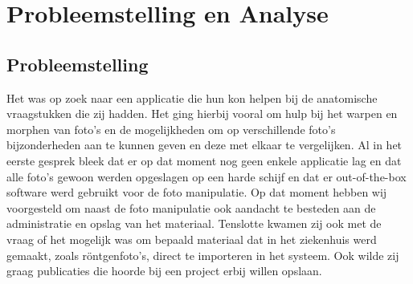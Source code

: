 \section{Probleemstelling en Analyse}
\label{Probleemstelling_en_analyse}
\subsection{Probleemstelling}
Het \casamproject was op zoek naar een applicatie die hun kon helpen bij de anatomische vraagstukken die zij hadden. 
Het ging hierbij vooral om hulp bij het warpen en morphen van foto's en de mogelijkheden om op verschillende foto's bijzonderheden aan te kunnen geven en deze met elkaar te vergelijken. 
Al in het eerste gesprek bleek dat er op dat moment nog geen enkele applicatie lag en dat alle foto's gewoon werden opgeslagen op een harde schijf en dat er out-of-the-box software werd gebruikt voor de foto manipulatie. 
Op dat moment hebben wij voorgesteld om naast de foto manipulatie ook aandacht te besteden aan de administratie en opslag van het materiaal.
Tenslotte kwamen zij ook met de vraag of het mogelijk was om bepaald materiaal dat in het ziekenhuis werd gemaakt, zoals r\"{o}ntgenfoto's, direct te importeren in het systeem. Ook wilde zij graag publicaties die hoorde bij een project erbij willen opslaan.

